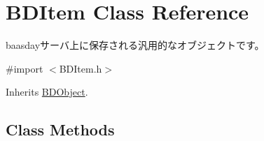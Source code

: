\hypertarget{interface_b_d_item}{\section{B\-D\-Item Class Reference}
\label{interface_b_d_item}
}


baasdayサーバ上に保存される汎用的なオブジェクトです。  




{\ttfamily \#import $<$B\-D\-Item.\-h$>$}



Inherits \hyperlink{interface_b_d_object}{B\-D\-Object}.

\subsection*{Class Methods}
